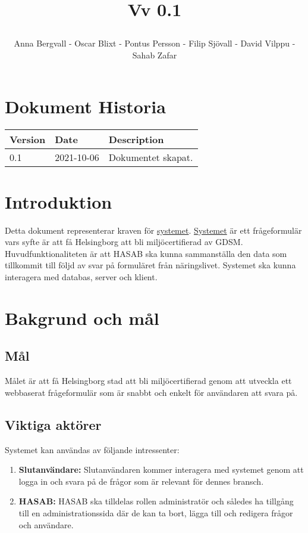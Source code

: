 \documentclass{article}
\date {#1}
\title {
    \documentNumber {01}    

    \documentTitle {Helsingborg Event and Convention Bureau}
    
    \documentDate {2021-08-20}
    \documentVersion Vv 0.1
    
    \author{Anna Bergvall - Oscar Blixt - Pontus Persson - Filip Sjövall - David Vilppu - Sahab Zafar}
}
\begin{document}
\maketitle

\thispagestyle{empty}



\newpage

\tableofcontents


\newpage

\section{Dokument Historia}
\begin{tabular}{ l | l | l }
    Version & Date & Description \\
    \hline
    0.1 & 2021-10-06 & Dokumentet skapat. \\
    
\end{tabular}

\section{Introduktion}
    Detta dokument representerar kraven för \underline{systemet}. \underline{Systemet} är ett frågeformulär vars syfte är att få Helsingborg att bli miljöcertifierad av GDSM. Huvudfunktionaliteten är att HASAB ska kunna sammanställa den data som tillkommit till följd av svar på formuläret från näringslivet. Systemet ska kunna interagera med databas, server och klient.
    

\section{Bakgrund och mål}

    \subsection{Mål}
       Målet är att få Helsingborg stad att bli miljöcertifierad genom att utveckla ett webbaserat frågeformulär som är snabbt och enkelt för användaren att svara på.
        
    \subsection{Viktiga aktörer}
    Systemet kan användas av följande intressenter:
    \begin{enumerate}
        \item \textbf{Slutanvändare:} Slutanvändaren kommer interagera med systemet genom att logga in och svara på de frågor som är relevant för dennes bransch.
        \item \textbf{HASAB:} HASAB ska tilldelas rollen administratör och således ha tillgång till en administrationssida där de kan ta bort, lägga till och redigera frågor och användare.
    \end{enumerate}
    
\end{document}
